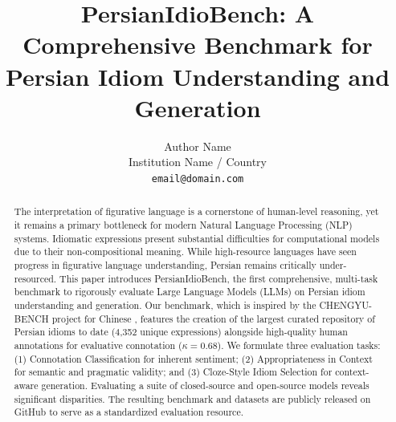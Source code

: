 \documentclass[11pt,a4paper]{article}
\begin{document}
\title{PersianIdioBench: A Comprehensive Benchmark for Persian Idiom Understanding and Generation}

\author{
  Author Name \\
  Institution Name / Country \\
  \texttt{email@domain.com}
}

\maketitle

\begin{abstract}
The interpretation of figurative language is a cornerstone of human-level reasoning, yet it remains a primary bottleneck for modern Natural Language Processing (NLP) systems. Idiomatic expressions present substantial difficulties for computational models due to their non-compositional meaning. While high-resource languages have seen progress in figurative language understanding, Persian remains critically under-resourced. This paper introduces PersianIdioBench, the first comprehensive, multi-task benchmark to rigorously evaluate Large Language Models (LLMs) on Persian idiom understanding and generation. Our benchmark, which is inspired by the CHENGYU-BENCH project for Chinese \citep{fu2025chengyubench}, features the creation of the largest curated repository of Persian idioms to date (4,352 unique expressions) alongside high-quality human annotations for evaluative connotation ($\kappa=0.68$). We formulate three evaluation tasks: (1) Connotation Classification for inherent sentiment; (2) Appropriateness in Context for semantic and pragmatic validity; and (3) Cloze-Style Idiom Selection for context-aware generation. Evaluating a suite of closed-source and open-source models reveals significant disparities. The resulting benchmark and datasets are publicly released on GitHub to serve as a standardized evaluation resource.
\end{abstract}
\end{document}
